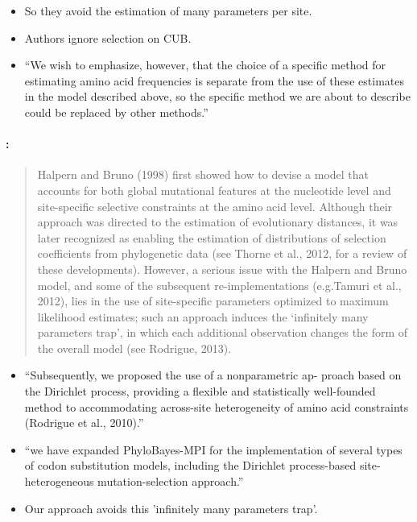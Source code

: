 \begin{itemize}
\begin{itemize}
\begin{itemize}
\begin{itemize}
    \item     So they avoid the estimation of many parameters per site.
    \item Authors ignore selection on CUB.
    \item ``We wish to emphasize, however, that the choice of a specific method for estimating amino acid frequencies is separate from the use of these estimates in the model described above, so the specific method we are about to describe could be replaced by other methods.''
    \end{itemize}
  \end{itemize}
\end{itemize}

\paragraph*{\citet{RodrigueAndLartillot2014}:}  %
\begin{quote}
  Halpern and Bruno (1998) first showed how to devise a model that accounts for both global mutational features at the nucleotide level and site-specific selective constraints at the amino acid level.
Although their approach was
directed to the estimation of evolutionary distances, it was later
recognized as enabling the estimation of distributions of selection
coefficients from phylogenetic data (see Thorne et al., 2012, for a
review of these developments). However, a serious issue with
the Halpern and Bruno model, and some of the subsequent re-implementations (e.g.Tamuri et al., 2012), lies in the use of site-specific parameters optimized to maximum likelihood estimates; such an approach induces the ‘infinitely many parameters trap’, in which each additional observation changes the form of the overall model (see Rodrigue, 2013).
\end{quote}

\begin{itemize}
\item ``Subsequently, we proposed the use of a nonparametric ap-
proach based on the Dirichlet process, providing a flexible and
statistically well-founded method to accommodating across-site
heterogeneity of amino acid constraints (Rodrigue et al., 2010).''
\item ``we have expanded PhyloBayes-MPI for the implementation of
several types of codon substitution models, including the
Dirichlet process-based site-heterogeneous mutation-selection
approach.''
\item Our approach avoids this 'infinitely many parameters trap'.
\end{itemize}


\end{itemize}
